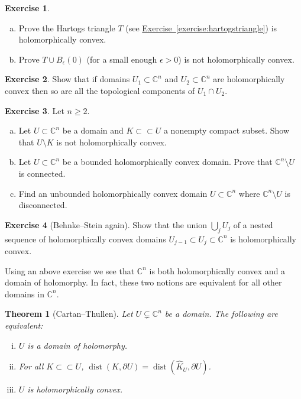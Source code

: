 \documentclass[12pt,openany]{book}
\newcommand{\C}{{\mathbb{C}}}
\theoremstyle{plain}
\newtheorem{thm}{Theorem}[section]
\theoremstyle{remark}
\theoremstyle{definition}
\newenvironment{exbox}{%
    \def\FrameCommand{\vrule width 1pt \relax\hspace {10pt}}%
    \MakeFramed {\advance \hsize -\width \FrameRestore }%
}{%
    \endMakeFramed
}
\newenvironment{exparts}{%
    \leavevmode\begin{enumerate}[a),noitemsep,topsep=0pt,parsep=0pt,partopsep=0pt]
}{%
    \end{enumerate}
}
\theoremstyle{exercise}
\newtheorem{exercise}{Exercise}[section]
\theoremstyle{example}
\newcommand{\exerciseref}[1]{\hyperref[#1]{Exercise~\ref*{#1}}}
\begin{document}
\begin{exbox}
\begin{exercise}
\begin{exparts}
\item Prove the Hartogs triangle $T$ (see \exerciseref{exercise:hartogstriangle})
is holomorphically convex.
\item Prove $T \cup B_{\epsilon}(0)$ (for a small enough $\epsilon > 0$) is
not holomorphically convex.
\end{exparts}
\end{exercise}

\begin{exercise}
Show that if domains $U_1 \subset \C^n$ and $U_2 \subset \C^n$ are
holomorphically convex
then so are all the topological components of $U_1 \cap U_2$.
\end{exercise}

\begin{exercise}
\pagebreak[2]
Let $n \geq 2$.
\begin{exparts}
\item
Let $U \subset \C^n$ be a domain and $K \subset \subset U$
a nonempty compact subset.  Show that $U \setminus K$ is not
holomorphically convex.
\item
Let $U \subset \C^n$ be a bounded holomorphically
convex domain.  Prove that $\C^n \setminus U$ is connected.
\item
Find an unbounded holomorphically convex domain $U \subset \C^n$ where
$\C^n \setminus U$ is disconnected.
\end{exparts}
\end{exercise}

\begin{exercise}[Behnke--Stein again]
Show that the union $\bigcup_j U_j$ of a nested sequence of holomorphically
convex domains $U_{j-1} \subset U_j \subset \C^n$ is holomorphically convex.
\end{exercise}
\end{exbox}

Using an above exercise we see that $\C^n$ is both holomorphically convex and
a domain of holomorphy.  In fact, these two notions are equivalent for all
other domains in $\C^n$.

\pagebreak[2]
\begin{thm}[Cartan--Thullen]
\label{thm:cartthul}
Let $U \subsetneq \C^n$ be a domain.  The following are equivalent:
\begin{enumerate}[(i)]
\item \label{thm:cartthul:domhol}
$U$ is a domain of holomorphy.
\item \label{thm:cartthul:disthull}
For all $K \subset \subset U$,
$\operatorname{dist}(K,\partial U) = \operatorname{dist}(\widehat{K}_U,\partial U)$.
\item \label{thm:cartthul:holconv}
$U$ is holomorphically convex.
\end{enumerate}
\end{thm}
\end{document}
